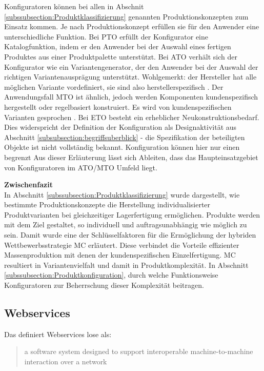 \documentclass[12pt,a4paper,bibliography=totocnumbered,listof=totoc]{scrartcl}
\begin{document}
Konfiguratoren können bei allen in Abschnit \ref{subssubsection:Produktklassifizierung} genannten Produktionskonzepten zum Einsatz kommen. Je nach Produktionskonzept erfüllen sie für den Anwender eine unterschiedliche Funktion. Bei \ac{PTO} erfüllt der Konfigurator eine Katalogfunktion, indem er den Anwender bei der Auswahl eines fertigen Produktes aus einer Produktpalette unterstützt. Bei \ac{ATO} verhält sich der Konfigurator wie ein Variantengenerator, der den Anwender bei der Auswahl der richtigen Variantenausprägung unterstützt. Wohlgemerkt: der Hersteller hat alle möglichen Variante vordefiniert, sie sind also herstellerspezifisch \citep{schomburg80}. Der Anwendungsfall \ac{MTO} ist ähnlich, jedoch werden Komponenten kundenspezifisch hergestellt oder regelbasiert konstruiert. Es wird von kundenspezifischen Varianten gesprochen \citep{schomburg80}. Bei \ac{ETO} besteht ein erheblicher Neukonstruktionsbedarf. Dies widerspricht der Definition der Konfiguration als Designaktivität aus Abschnitt \ref{subsubsection:begriffsuberblick}
 - die Spezifikation der beteiligten Objekte ist nicht vollständig bekannt. Konfiguration können hier nur einen begrenzt Aus dieser Erläuterung lässt sich Ableiten, dass das Haupteinsatzgebiet von Konfiguratoren im \ac{ATO}/\ac{MTO} Umfeld liegt.

\textbf{Zwischenfazit}\\
In Abschnitt \ref{subssubsection:Produktklassifizierung} wurde dargestellt, wie bestimmte Produktionskonzepte die Herstellung individualisierter Produktvarianten bei gleichzeitiger Lagerfertigung ermöglichen. Produkte werden mit dem Ziel gestaltet, so individuell und auftragsunabhängig wie möglich zu sein. Damit wurde eine der Schlüsselfaktoren für die Ermöglichung der hybriden Wettbewerbsstrategie \ac{MC} erläutert. Diese verbindet die Vorteile effizienter Massenproduktion mit denen
der kundenspezifischen Einzelfertigung\citep{piller98}. \ac{MC} resultiert in Variantenvielfalt und damit in Produktkomplexität. In Abschnitt \ref{subssubsection:Produktkonfiguration}, durch welche Funktionsweise Konfiguratoren zur Beherrschung dieser Komplexität beitragen.


\pagebreak
\subsection{Webservices}

Das \citet	{w3c04} definiert Webservices lose als:

\begin{quote}
\glqq [...] a software system designed to support interoperable machine-to-machine interaction over a network\grqq
\end{quote}
\end{document}
